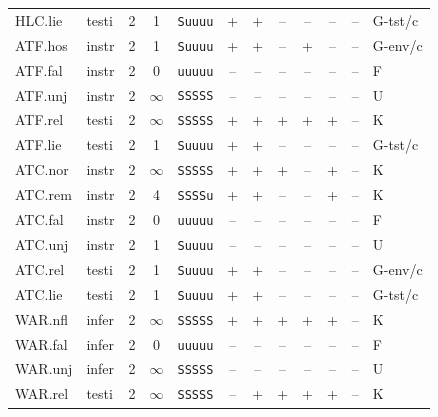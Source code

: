 {\begin{longtable}{@{}llcccccccccl@{}}
HLC.lie & testi & 2 & 1 & \texttt{Suuuu} & \textsf{+} & \textsf{+} & \textsf{--} & \textsf{--} & \textsf{--} & -- & G-tst/c \\
ATF.hos & instr & 2 & 1 & \texttt{Suuuu} & \textsf{+} & \textsf{+} & \textsf{--} & \textsf{+} & \textsf{--} & -- & G-env/c \\
ATF.fal & instr & 2 & 0 & \texttt{uuuuu} & \textsf{--} & \textsf{--} & \textsf{--} & \textsf{--} & \textsf{--} & -- & F \\
ATF.unj & instr & 2 & $\infty$ & \texttt{SSSSS} & \textsf{--} & \textsf{--} & \textsf{--} & \textsf{--} & \textsf{--} & -- & U \\
ATF.rel & testi & 2 & $\infty$ & \texttt{SSSSS} & \textsf{+} & \textsf{+} & \textsf{+} & \textsf{+} & \textsf{+} & -- & K \\
ATF.lie & testi & 2 & 1 & \texttt{Suuuu} & \textsf{+} & \textsf{+} & \textsf{--} & \textsf{--} & \textsf{--} & -- & G-tst/c \\
ATC.nor & instr & 2 & $\infty$ & \texttt{SSSSS} & \textsf{+} & \textsf{+} & \textsf{+} & \textsf{--} & \textsf{+} & -- & K \\
ATC.rem & instr & 2 & 4 & \texttt{SSSSu} & \textsf{+} & \textsf{+} & \textsf{--} & \textsf{--} & \textsf{+} & -- & K \\
ATC.fal & instr & 2 & 0 & \texttt{uuuuu} & \textsf{--} & \textsf{--} & \textsf{--} & \textsf{--} & \textsf{--} & -- & F \\
ATC.unj & instr & 2 & 1 & \texttt{Suuuu} & \textsf{--} & \textsf{--} & \textsf{--} & \textsf{--} & \textsf{--} & -- & U \\
ATC.rel & testi & 2 & 1 & \texttt{Suuuu} & \textsf{+} & \textsf{+} & \textsf{--} & \textsf{--} & \textsf{--} & -- & G-env/c \\
ATC.lie & testi & 2 & 1 & \texttt{Suuuu} & \textsf{+} & \textsf{+} & \textsf{--} & \textsf{--} & \textsf{--} & -- & G-tst/c \\
WAR.nfl & infer & 2 & $\infty$ & \texttt{SSSSS} & \textsf{+} & \textsf{+} & \textsf{+} & \textsf{+} & \textsf{+} & -- & K \\
WAR.fal & infer & 2 & 0 & \texttt{uuuuu} & \textsf{--} & \textsf{--} & \textsf{--} & \textsf{--} & \textsf{--} & -- & F \\
WAR.unj & infer & 2 & $\infty$ & \texttt{SSSSS} & \textsf{--} & \textsf{--} & \textsf{--} & \textsf{--} & \textsf{--} & -- & U \\
WAR.rel & testi & 2 & $\infty$ & \texttt{SSSSS} & \textsf{--} & \textsf{+} & \textsf{+} & \textsf{+} & \textsf{+} & -- & K \\

\end{longtable}}

